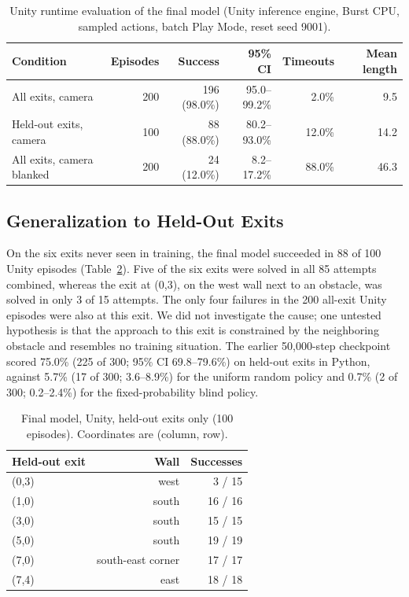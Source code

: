 \documentclass[conference]{IEEEtran}
\begin{document}
\begin{table}[!t]
\caption{Unity runtime evaluation of the final model (Unity inference engine, Burst CPU, sampled actions, batch Play Mode, reset seed 9001).}
\label{tab:unity}
\centering\footnotesize\renewcommand{\arraystretch}{1.12}
\begin{tabular}{@{}lrrrrr@{}}
\toprule
Condition & Episodes & Success & 95\% CI & Timeouts & Mean length \\ \midrule
All exits, camera & 200 & 196 (98.0\%) & 95.0--99.2\% & 2.0\% & 9.5 \\
Held-out exits, camera & 100 & 88 (88.0\%) & 80.2--93.0\% & 12.0\% & 14.2 \\
All exits, camera blanked & 200 & 24 (12.0\%) & 8.2--17.2\% & 88.0\% & 46.3 \\
\bottomrule
\end{tabular}
\end{table}


\subsection{Generalization to Held-Out Exits}
On the six exits never seen in training, the final model succeeded in 88 of 100 Unity episodes (Table~\ref{tab:heldout}). Five of the six exits were solved in all 85 attempts combined, whereas the exit at (0,3), on the west wall next to an obstacle, was solved in only 3 of 15 attempts. The only four failures in the 200 all-exit Unity episodes were also at this exit. We did not investigate the cause; one untested hypothesis is that the approach to this exit is constrained by the neighboring obstacle and resembles no training situation. The earlier 50,000-step checkpoint scored 75.0\% (225 of 300; 95\% CI 69.8--79.6\%) on held-out exits in Python, against 5.7\% (17 of 300; 3.6--8.9\%) for the uniform random policy and 0.7\% (2 of 300; 0.2--2.4\%) for the fixed-probability blind policy.

\begin{table}[!t]
\caption{Final model, Unity, held-out exits only (100 episodes). Coordinates are (column, row).}
\label{tab:heldout}
\centering\footnotesize\renewcommand{\arraystretch}{1.12}
\begin{tabular}{@{}lrr@{}}
\toprule
Held-out exit & Wall & Successes \\ \midrule
(0,3) & west & 3 / 15 \\
(1,0) & south & 16 / 16 \\
(3,0) & south & 15 / 15 \\
(5,0) & south & 19 / 19 \\
(7,0) & south-east corner & 17 / 17 \\
(7,4) & east & 18 / 18 \\
\bottomrule
\end{tabular}
\end{table}
\end{document}
